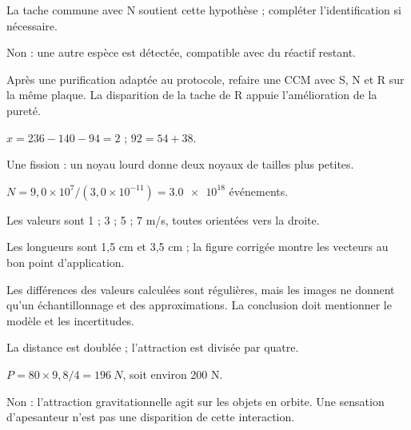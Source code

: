 \begin{questions}
\item La tache commune avec N soutient cette hypothèse ; compléter l’identification si nécessaire.
\item Non : une autre espèce est détectée, compatible avec du réactif restant.
\item Après une purification adaptée au protocole, refaire une CCM avec S, N et R sur la même plaque. La disparition de la tache de R appuie l’amélioration de la pureté.
\end{questions}

\begin{questions}
\item $x=236-140-94=2$ ; $92=54+38$.
\item Une fission : un noyau lourd donne deux noyaux de tailles plus petites.
\item $N=9,0\times10^7/(3,0\times10^{-11})=\num{3,0e18}$ événements.
\end{questions}

\begin{questions}
\item Les valeurs sont 1 ; 3 ; 5 ; 7 m/s, toutes orientées vers la droite.
\item Les longueurs sont 1,5 cm et 3,5 cm ; la figure corrigée montre les vecteurs au bon point d’application.
\item Les différences des valeurs calculées sont régulières, mais les images ne donnent qu’un échantillonnage et des approximations. La conclusion doit mentionner le modèle et les incertitudes.
\end{questions}

\begin{questions}
\item La distance est doublée ; l’attraction est divisée par quatre.
\item $P=80\times9,8/4=\qty{196}{N}$, soit environ 200 N.
\item Non : l’attraction gravitationnelle agit sur les objets en orbite. Une sensation d’apesanteur n’est pas une disparition de cette interaction.
\end{questions}

